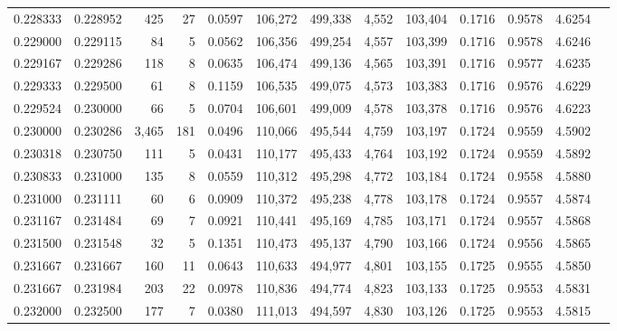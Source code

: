 \begin{tabular}{rrrrrrrrrrrrr}
0.228333 & 0.228952 &   425 &  27 &                                     0.0597 & 106,272 & 499,338 &   4,552 & 103,404 & 0.1716 & 0.9578 & 4.6254 \\
0.229000 & 0.229115 &    84 &   5 &                                     0.0562 & 106,356 & 499,254 &   4,557 & 103,399 & 0.1716 & 0.9578 & 4.6246 \\
0.229167 & 0.229286 &   118 &   8 &                                     0.0635 & 106,474 & 499,136 &   4,565 & 103,391 & 0.1716 & 0.9577 & 4.6235 \\
0.229333 & 0.229500 &    61 &   8 &                                     0.1159 & 106,535 & 499,075 &   4,573 & 103,383 & 0.1716 & 0.9576 & 4.6229 \\
0.229524 & 0.230000 &    66 &   5 &                                     0.0704 & 106,601 & 499,009 &   4,578 & 103,378 & 0.1716 & 0.9576 & 4.6223 \\
0.230000 & 0.230286 & 3,465 & 181 &                                     0.0496 & 110,066 & 495,544 &   4,759 & 103,197 & 0.1724 & 0.9559 & 4.5902 \\
0.230318 & 0.230750 &   111 &   5 &                                     0.0431 & 110,177 & 495,433 &   4,764 & 103,192 & 0.1724 & 0.9559 & 4.5892 \\
0.230833 & 0.231000 &   135 &   8 &                                     0.0559 & 110,312 & 495,298 &   4,772 & 103,184 & 0.1724 & 0.9558 & 4.5880 \\
0.231000 & 0.231111 &    60 &   6 &                                     0.0909 & 110,372 & 495,238 &   4,778 & 103,178 & 0.1724 & 0.9557 & 4.5874 \\
0.231167 & 0.231484 &    69 &   7 &                                     0.0921 & 110,441 & 495,169 &   4,785 & 103,171 & 0.1724 & 0.9557 & 4.5868 \\
0.231500 & 0.231548 &    32 &   5 &                                     0.1351 & 110,473 & 495,137 &   4,790 & 103,166 & 0.1724 & 0.9556 & 4.5865 \\
0.231667 & 0.231667 &   160 &  11 &                                     0.0643 & 110,633 & 494,977 &   4,801 & 103,155 & 0.1725 & 0.9555 & 4.5850 \\
0.231667 & 0.231984 &   203 &  22 &                                     0.0978 & 110,836 & 494,774 &   4,823 & 103,133 & 0.1725 & 0.9553 & 4.5831 \\
0.232000 & 0.232500 &   177 &   7 &                                     0.0380 & 111,013 & 494,597 &   4,830 & 103,126 & 0.1725 & 0.9553 & 4.5815 \\

\end{tabular}
